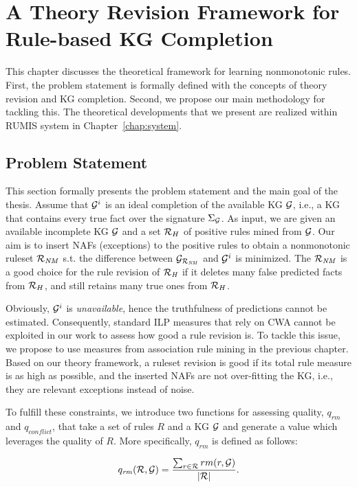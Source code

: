 \chapter{A Theory Revision Framework for Rule-based KG Completion}
\label{chap:frame}

This chapter discusses the theoretical framework for learning nonmonotonic rules. First, the problem statement is formally defined with the concepts of theory revision and KG completion. Second, we propose our main methodology for tackling this. The theoretical developments that we present are realized within RUMIS system in Chapter~\ref{chap:system}.

\section{Problem Statement}

This section formally presents the problem statement and the main goal of the thesis. Assume that $\mathcal{G}^i$ is an ideal completion of the available KG $\mathcal{G}$, i.e., a KG that contains every true fact over the signature $\Sigma_{\mathcal{G}}$. As input, we are given an available incomplete KG $\mathcal{G}$ and a set $\mathcal{R}_H$ of positive rules mined from $\mathcal{G}$. Our aim is to insert NAFs (exceptions) to the positive rules to obtain a nonmonotonic ruleset $\mathcal{R}_{\mathit{NM}}$ s.t. the difference between $\mathcal{G}_{\mathcal{R}_{\mathit{NM}}}$ and $\mathcal{G}^i$ is minimized. The $\mathcal{R}_{\mathit{NM}}$ is a good choice for the rule revision of $\mathcal{R}_{\mathit{H}}$ if it deletes many false predicted facts from $\mathcal{R}_H$, and still retains many true ones from $\mathcal{R}_H$.

Obviously, $\mathcal{G}^i$ is \emph{unavailable}, hence the truthfulness of predictions cannot be estimated. Consequently, standard ILP measures that rely on CWA cannot be exploited in our work to assess how good a rule revision is. To tackle this issue, we propose to use measures from association rule mining in the previous chapter. Based on our theory framework, a ruleset revision is good if its total rule measure is as high as possible, and the inserted NAFs are not over-fitting the KG, i.e., they are relevant exceptions instead of noise.

To fulfill these constraints, we introduce two functions for assessing quality, $q_{rm}$ and $q_{conflict}$, that take a set of rules $R$ and a KG $\mathcal{G}$ and generate a value which leverages the quality of $R$. More specifically, $q_{rm}$ is defined as follows:

\begin{equation}
q_{\mathit{rm}}(\mathcal{R},\mathcal{G})=\dfrac{\sum_{r\in \mathcal{R}}rm(r,\mathcal{G})}{|\mathcal{R}|}.
\end{equation}

